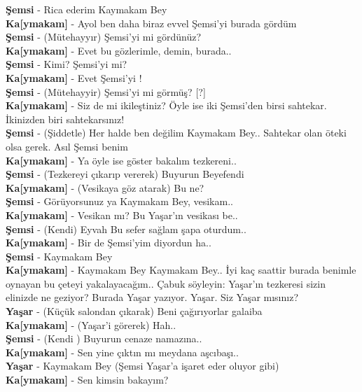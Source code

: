 \documentclass[]{book}
\begin{document}
\textbf{Şemsi} - Rica ederim Kaymakam Bey\\
\textbf{Ka{[}ymakam{]}} - Ayol ben daha biraz evvel Şemsi'yi burada gördüm\\
\textbf{Şemsi} - (Mütehayyır) Şemsi'yi mi gördünüz?\\
\textbf{Ka{[}ymakam{]}} - Evet bu gözlerimle, demin, burada..\\
\textbf{Şemsi} - Kimi? Şemsi'yi mi?\\
\textbf{Ka{[}ymakam{]}} - Evet Şemsi'yi !\\
\textbf{Şemsi} - (Mütehayyir) Şemsi'yi mi görmüş? {[}?{]}\\
\textbf{Ka{[}ymakam{]}} - Siz de mi ikileştiniz? Öyle ise iki Şemsi'den birsi sahtekar. İkinizden biri sahtekarsınız!\\
\textbf{Şemsi} - (Şiddetle) Her halde ben değilim Kaymakam Bey.. Sahtekar olan öteki olsa gerek. Asıl Şemsi benim\\
\textbf{Ka{[}ymakam{]}} - Ya öyle ise göster bakalım tezkereni..\\
\textbf{Şemsi} - (Tezkereyi çıkarıp vererek) Buyurun Beyefendi\\
\textbf{Ka{[}ymakam{]}} - (Vesikaya göz atarak) Bu ne?\\
\textbf{Şemsi} - Görüyorsunuz ya Kaymakam Bey, vesikam..\\
\textbf{Ka{[}ymakam{]}} - Vesikan mı? Bu Yaşar'ın vesikası be..\\
\textbf{Şemsi} - (Kendi) Eyvah Bu sefer sağlam şapa oturdum..\\
\textbf{Ka{[}ymakam{]}} - Bir de Şemsi'yim diyordun ha..\\
\textbf{Şemsi} - Kaymakam Bey\\
\textbf{Ka{[}ymakam{]}} - Kaymakam Bey Kaymakam Bey.. İyi kaç saattir burada benimle oynayan bu çeteyi yakalayacağım.. Çabuk söyleyin: Yaşar'ın tezkeresi sizin elinizde ne geziyor? Burada Yaşar yazıyor. Yaşar. Siz Yaşar mısınız?\\
\textbf{Yaşar} - (Küçük salondan çıkarak) Beni çağırıyorlar galaiba\\
\textbf{Ka{[}ymakam{]}} - (Yaşar'i görerek) Hah..\\
\textbf{Şemsi} - (Kendi ) Buyurun cenaze namazına..\\
\textbf{Ka{[}ymakam{]}} - Sen yine çıktın mı meydana aşcıbaşı..\\
\textbf{Yaşar} - Kaymakam Bey (Şemsi Yaşar'a işaret eder oluyor gibi)\\
\textbf{Ka{[}ymakam{]}} - Sen kimsin bakayım?\\
\end{document}
